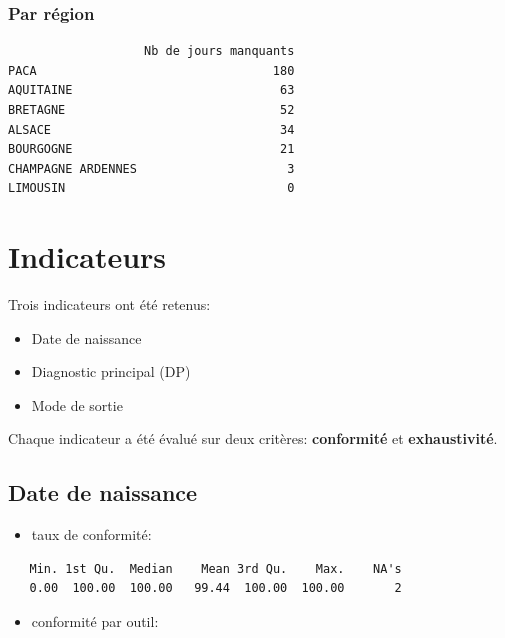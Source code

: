 \documentclass[]{article}
\providecommand{\tightlist}{%
  \setlength{\itemsep}{0pt}\setlength{\parskip}{0pt}}
\begin{document}
\subsubsection{Par région}\label{par-region}

\begin{verbatim}
                   Nb de jours manquants
PACA                                 180
AQUITAINE                             63
BRETAGNE                              52
ALSACE                                34
BOURGOGNE                             21
CHAMPAGNE ARDENNES                     3
LIMOUSIN                               0
\end{verbatim}

\section{Indicateurs}\label{indicateurs}

Trois indicateurs ont été retenus:

\begin{itemize}
\tightlist
\item
  Date de naissance
\item
  Diagnostic principal (DP)
\item
  Mode de sortie
\end{itemize}

Chaque indicateur a été évalué sur deux critères: \textbf{conformité} et
\textbf{exhaustivité}.

\subsection{Date de naissance}\label{date-de-naissance}

\begin{itemize}
\tightlist
\item
  taux de conformité:
\end{itemize}

\begin{verbatim}
   Min. 1st Qu.  Median    Mean 3rd Qu.    Max.    NA's 
   0.00  100.00  100.00   99.44  100.00  100.00       2 
\end{verbatim}

\begin{itemize}
\tightlist
\item
  conformité par outil:
\end{itemize}
\end{document}
